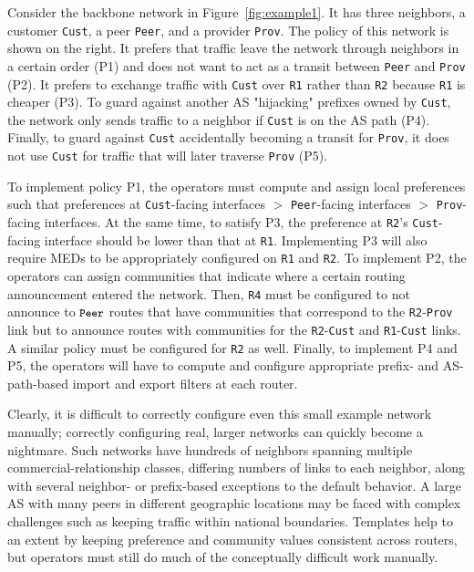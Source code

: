 \documentclass[10pt]{sigalternate052015}
\newcommand{\sysname}{{\small \sf Propane}\xspace}
\newcommand{\CD}[1]{\texttt{\small #1}}  %
\begin{document}
Consider the backbone network in Figure~\ref{fig:example1}. It has
three neighbors, a customer \CD{Cust}, a peer \CD{Peer}, and a provider \CD{Prov}. The policy of this network is shown on the right. It prefers that traffic leave the network through neighbors in a certain order (P1) and does not want to act as a transit between \CD{Peer} and \CD{Prov} (P2). It prefers to exchange traffic with \CD{Cust} over \CD{R1} rather than \CD{R2} because \CD{R1} is cheaper (P3). To guard against another AS "hijacking" prefixes owned by \CD{Cust}, the network only sends traffic to a neighbor if \CD{Cust} is on the AS path (P4). Finally, to guard against \CD{Cust} accidentally becoming a transit for \CD{Prov}, it does not use \CD{Cust} for traffic that will later traverse \CD{Prov} (P5).

To implement policy P1, the operators must compute and assign
local preferences such that preferences at \CD{Cust}-facing interfaces
$>$ \CD{Peer}-facing interfaces $>$ \CD{Prov}-facing interfaces. At
the same time, to satisfy P3, the preference at \CD{R2}'s
\CD{Cust}-facing interface should be lower than that at
\CD{R1}. Implementing P3 will also require MEDs to be appropriately configured on \CD{R1} and \CD{R2}.
To implement P2, the operators can assign communities that
indicate where a certain routing announcement entered the
network. Then, \CD{R4} must be configured to not announce to
$\CD{Peer}$ routes that have communities that correspond to the
\CD{R2}-\CD{Prov} link but to announce routes with communities for the \CD{R2}-\CD{Cust} and \CD{R1}-\CD{Cust} links. A similar policy must be configured for \CD{R2} as well. Finally, to implement P4 and P5, the operators will have to compute and configure appropriate prefix- and AS-path-based import and export filters at each router.

Clearly, it is difficult to correctly configure even this
small example network manually; correctly configuring real, larger networks can quickly become a nightmare. Such networks have hundreds of neighbors spanning multiple commercial-relationship classes, differing numbers of links to each neighbor, along with several neighbor- or prefix-based exceptions to the default behavior. A large AS with many peers in different geographic locations may be faced with complex challenges such as keeping traffic within national boundaries.
Templates help to an extent by keeping preference and community values consistent across routers, but operators must still do much of the conceptually difficult work manually.
\end{document}
